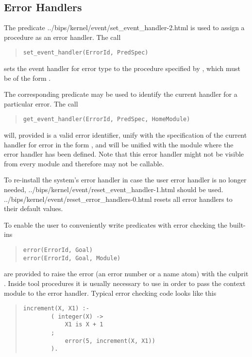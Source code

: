 \subsection{Error Handlers}
The predicate %
{../bips/kernel/event/set_event_handler-2.html} is used to assign a procedure as
an error handler. The call
\begin{quote}
\begin{verbatim}
set_event_handler(ErrorId, PredSpec)
\end{verbatim}
\end{quote}
sets the event handler for error type  to the procedure specified
by , which must be of the form .

The corresponding predicate
may be used to identify
the current handler for a particular error. The call
\begin{quote}
\begin{verbatim}
get_event_handler(ErrorId, PredSpec, HomeModule)
\end{verbatim}
\end{quote}
will, provided  is a valid error identifier, unify
with the
specification of the current handler for error  in the form
, and  will be unified with the module
where the
error handler has been defined. Note that this error handler might not be
visible from every module and therefore may not be callable.

To re-install the system's error handler in case the user error handler is
no longer needed,
%
{../bips/kernel/event/reset_event_handler-1.html}
should be used.
%
{../bips/kernel/event/reset_error_handlers-0.html} resets all error handlers to
their default values.

To enable the user to conveniently write predicates with error checking
the built-ins
\begin{quote}
\begin{verbatim}
error(ErrorId, Goal)
error(ErrorId, Goal, Module)
\end{verbatim}
\end{quote}
are provided to raise the error  (an error number or a name atom)
with the culprit .
Inside tool procedures it is usually necessary to use
in order to pass the context module to the error handler.
Typical error checking code looks like this
\begin{quote}
\begin{verbatim}
increment(X, X1) :-
        ( integer(X) ->
            X1 is X + 1
        ;
            error(5, increment(X, X1))
        ).
\end{verbatim}
\end{quote}

